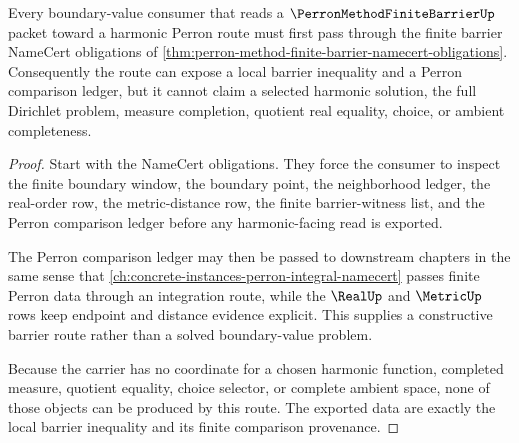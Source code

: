 \begin{theorem}
\label{thm:perron-method-finite-barrier-harmonic-route}
Every boundary-value consumer that reads a $\PerronMethodFiniteBarrierUp$ packet toward a harmonic Perron route must first pass through the finite barrier NameCert obligations of \autoref{thm:perron-method-finite-barrier-namecert-obligations}. Consequently the route can expose a local barrier inequality and a Perron comparison ledger, but it cannot claim a selected harmonic solution, the full Dirichlet problem, measure completion, quotient real equality, choice, or ambient completeness.
\end{theorem}
\begin{proof}
Start with the NameCert obligations. They force the consumer to inspect the finite boundary window, the boundary point, the neighborhood ledger, the real-order row, the metric-distance row, the finite barrier-witness list, and the Perron comparison ledger before any harmonic-facing read is exported.

The Perron comparison ledger may then be passed to downstream chapters in the same sense that \autoref{ch:concrete-instances-perron-integral-namecert} passes finite Perron data through an integration route, while the $\RealUp$ and $\MetricUp$ rows keep endpoint and distance evidence explicit. This supplies a constructive barrier route rather than a solved boundary-value problem.

Because the carrier has no coordinate for a chosen harmonic function, completed measure, quotient equality, choice selector, or complete ambient space, none of those objects can be produced by this route. The exported data are exactly the local barrier inequality and its finite comparison provenance.
\end{proof}



